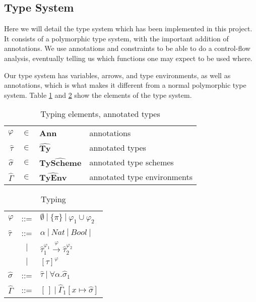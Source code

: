 \documentclass[a4paper]{article}
\begin{document}
\subsection{Type System}

Here we will detail the type system which has been implemented in this project.
It consists of a polymorphic type system, with the important addition of
annotations. We use annotations and constraints to be able to do a control-flow
analysis, eventually telling us which functions one may expect to be used where. 

Our type system has variables, arrows, and type environments, as well as
annotations, which is what makes it different from a normal polymorphic type
system. Table \ref{tab:typingelems} and \ref{tab:typing} show the elements of
the type system. 

\begin{table}
    \begin{centering}
    \begin{tabular}{rcll}
        $\varphi$ &               $\in$ & \textbf{Ann}                   & annotations \\ 
        $\widehat{\tau}$&         $\in$ & $\widehat{\textbf{Ty}      } $ & annotated types \\
        $\widehat{\sigma} $&      $\in$ & $\widehat{\textbf{TyScheme}} $ & annotated type schemes\\
        $\widehat{\Gamma}$&       $\in$ & $\widehat{\textbf{TyEnv}   } $ & annotated type environments  \\
    \end{tabular}
    \caption{Typing elements, annotated types}
    \label{tab:typingelems}
    \end{centering}
\end{table}
\begin{table}
    \begin{centering}
    \begin{tabular}{lcl}
        $ \varphi$         & ::= & $ \emptyset \:|\: \{\pi\} \:|\: \varphi_1 \cup \varphi_2 $ \\
        $\widehat{\tau}$   & ::= & $\alpha \:|\: Nat \: | \: Bool \: | \: $ \\
        & $|$ & $\widehat{\tau}_1^{\varphi_1}
                           \stackrel{\varphi}{\rightarrow} 
                           \widehat{\tau}_2^{\varphi_2} $ \\
                           & $|$ & $ %
                           [\widehat{\tau}]^\varphi   $ \\ 
        $\widehat{\sigma}$ & ::= & $\widehat{\tau} \:|\: \forall \alpha. \widehat{\sigma}_1 $ \\ 
        $\widehat{\Gamma}$ & ::= & $[\,] \:|\: \widehat{\Gamma}_1[x \mapsto \widehat{\sigma}] $ \\
    \end{tabular}
    \caption{Typing}
    \label{tab:typing}
    \end{centering}
\end{table}
\end{document}
